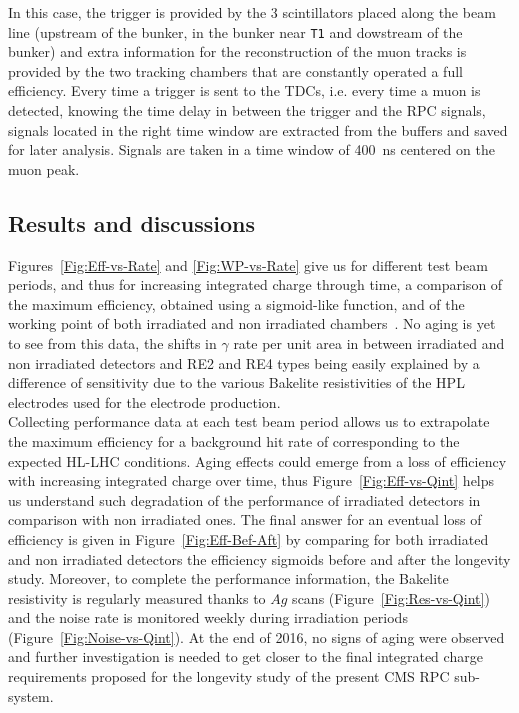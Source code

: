 	
	
	In this case, the trigger is provided by the 3 scintillators placed along the beam line (upstream of the bunker, in the bunker near \texttt{T1} and dowstream of the bunker) and extra information for the reconstruction of the muon tracks is provided by the two tracking chambers that are constantly operated a full efficiency. Every time a trigger is sent to the TDCs, i.e. every time a muon is detected, knowing the time delay in between the trigger and the RPC signals, signals located in the right time window are extracted from the buffers and saved for later analysis. Signals are taken in a time window of \SI{400}{ns} centered on the muon peak.
	
	\subsection{Results and discussions}
	\label{chapt5:ssec:resultsGIFpp}
    
	Figures~\ref{Fig:Eff-vs-Rate} and \ref{Fig:WP-vs-Rate} give us for different test beam periods, and thus for increasing integrated charge through time, a comparison of the maximum efficiency, obtained using a sigmoid-like function, and of the working point of both irradiated and non irradiated chambers~\cite{ABBRESCIA2005}. No aging is yet to see from this data, the shifts in $\gamma$ rate per unit area  in between irradiated and non irradiated detectors and RE2 and RE4 types being easily explained by a difference of sensitivity due to the various Bakelite resistivities of the HPL electrodes used for the electrode production.\\
     Collecting performance data at each test beam period allows us to extrapolate the maximum efficiency for a background hit rate of  corresponding to the expected HL-LHC conditions. Aging effects could emerge from a loss of efficiency with increasing integrated charge over time, thus Figure~\ref{Fig:Eff-vs-Qint} helps us understand such degradation of the performance of irradiated detectors in comparison with non irradiated ones. The final answer for an eventual loss of efficiency is given in Figure~\ref{Fig:Eff-Bef-Aft} by comparing for both irradiated and non irradiated detectors the efficiency sigmoids before and after the longevity study. Moreover, to complete the performance information, the Bakelite resistivity is regularly measured thanks to $Ag$ scans (Figure~\ref{Fig:Res-vs-Qint}) and the noise rate is monitored weekly during irradiation periods (Figure~\ref{Fig:Noise-vs-Qint}). At the end of 2016, no signs of aging were observed and further investigation is needed to get closer to the final integrated charge requirements proposed for the longevity study of the present CMS RPC sub-system.\\
    
